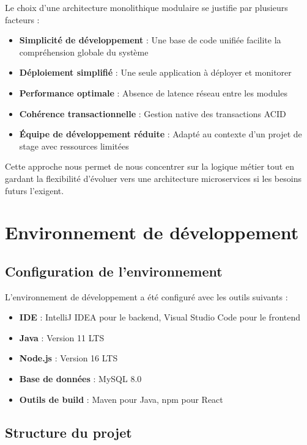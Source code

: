 \documentclass[12pt,a4paper]{report}
\begin{document}
Le choix d'une architecture monolithique modulaire se justifie par plusieurs facteurs :

\begin{itemize}
    \item \textbf{Simplicité de développement} : Une base de code unifiée facilite la compréhension globale du système
    \item \textbf{Déploiement simplifié} : Une seule application à déployer et monitorer
    \item \textbf{Performance optimale} : Absence de latence réseau entre les modules
    \item \textbf{Cohérence transactionnelle} : Gestion native des transactions ACID
    \item \textbf{Équipe de développement réduite} : Adapté au contexte d'un projet de stage avec ressources limitées
\end{itemize}

Cette approche nous permet de nous concentrer sur la logique métier tout en gardant la flexibilité d'évoluer vers une architecture microservices si les besoins futurs l'exigent.

\section{Environnement de développement}

\subsection{Configuration de l'environnement}

L'environnement de développement a été configuré avec les outils suivants :

\begin{itemize}
    \item \textbf{IDE} : IntelliJ IDEA pour le backend, Visual Studio Code pour le frontend
    \item \textbf{Java} : Version 11 LTS
    \item \textbf{Node.js} : Version 16 LTS
    \item \textbf{Base de données} : MySQL 8.0
    \item \textbf{Outils de build} : Maven pour Java, npm pour React
\end{itemize}

\subsection{Structure du projet}
\end{document}
